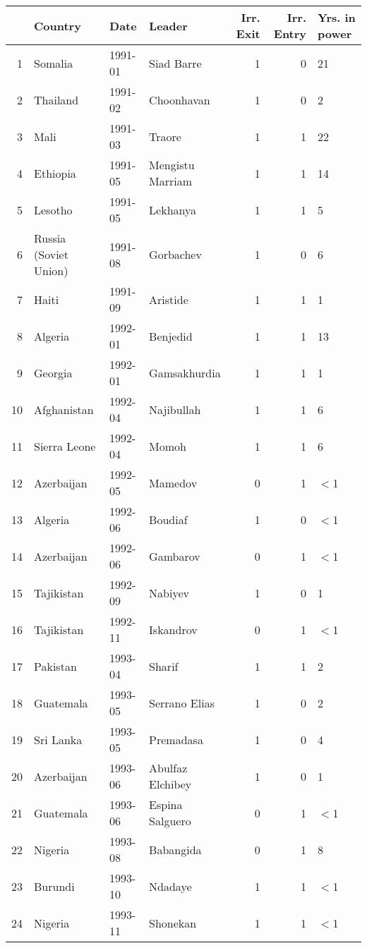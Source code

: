 \begin{table}[ht]
\centering
\begin{tabular}{rlllrrl}
  \hline
 & Country & Date & Leader & Irr. Exit & Irr. Entry & Yrs. in power \\ 
  \hline
1 & Somalia & 1991-01 & Siad Barre & 1 & 0 & 21 \\ 
  2 & Thailand & 1991-02 & Choonhavan & 1 & 0 & 2 \\ 
  3 & Mali & 1991-03 & Traore & 1 & 1 & 22 \\ 
  4 & Ethiopia & 1991-05 & Mengistu Marriam & 1 & 1 & 14 \\ 
  5 & Lesotho & 1991-05 & Lekhanya & 1 & 1 & 5 \\ 
  6 & Russia (Soviet Union) & 1991-08 & Gorbachev & 1 & 0 & 6 \\ 
  7 & Haiti & 1991-09 & Aristide & 1 & 1 & 1 \\ 
  8 & Algeria & 1992-01 & Benjedid & 1 & 1 & 13 \\ 
  9 & Georgia & 1992-01 & Gamsakhurdia & 1 & 1 & 1 \\ 
  10 & Afghanistan & 1992-04 & Najibullah & 1 & 1 & 6 \\ 
  11 & Sierra Leone & 1992-04 & Momoh & 1 & 1 & 6 \\ 
  12 & Azerbaijan & 1992-05 & Mamedov & 0 & 1 & $<$1 \\ 
  13 & Algeria & 1992-06 & Boudiaf & 1 & 0 & $<$1 \\ 
  14 & Azerbaijan & 1992-06 & Gambarov & 0 & 1 & $<$1 \\ 
  15 & Tajikistan & 1992-09 & Nabiyev & 1 & 0 & 1 \\ 
  16 & Tajikistan & 1992-11 & Iskandrov & 0 & 1 & $<$1 \\ 
  17 & Pakistan & 1993-04 & Sharif & 1 & 1 & 2 \\ 
  18 & Guatemala & 1993-05 & Serrano Elias & 1 & 0 & 2 \\ 
  19 & Sri Lanka & 1993-05 & Premadasa & 1 & 0 & 4 \\ 
  20 & Azerbaijan & 1993-06 & Abulfaz Elchibey & 1 & 0 & 1 \\ 
  21 & Guatemala & 1993-06 & Espina Salguero & 0 & 1 & $<$1 \\ 
  22 & Nigeria & 1993-08 & Babangida & 0 & 1 & 8 \\ 
  23 & Burundi & 1993-10 & Ndadaye & 1 & 1 & $<$1 \\ 
  24 & Nigeria & 1993-11 & Shonekan & 1 & 1 & $<$1 \\ 

\end{tabular}
\end{table}
